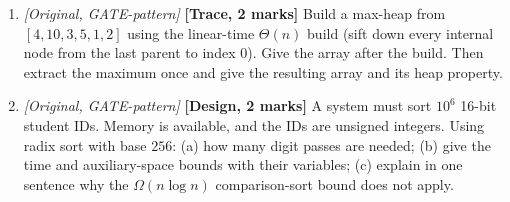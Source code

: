 \documentclass[11pt]{article}
\begin{document}
\begin{enumerate}
\item[\textbf{Q9}] \textit{[Original, GATE-pattern]} \textbf{[Trace, 2 marks]} Build a max-heap from $[4,10,3,5,1,2]$ using the linear-time $\Theta(n)$ build (sift down every internal node from the last parent to index $0$). Give the array after the build. Then extract the maximum once and give the resulting array and its heap property.

\item[\textbf{Q10}] \textit{[Original, GATE-pattern]} \textbf{[Design, 2 marks]} A system must sort $10^6$ 16-bit student IDs. Memory is available, and the IDs are unsigned integers. Using radix sort with base $256$: (a) how many digit passes are needed; (b) give the time and auxiliary-space bounds with their variables; (c) explain in one sentence why the $\Omega(n\log n)$ comparison-sort bound does not apply.
\end{enumerate}
\end{document}
